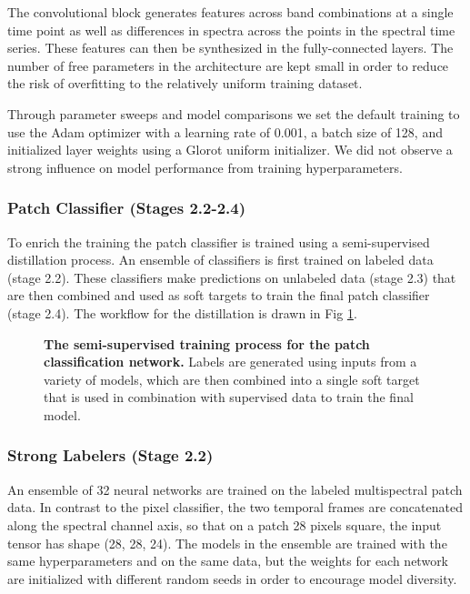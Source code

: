 \documentclass[10pt,letterpaper]{article}
\begin{document}
The convolutional block generates features across band combinations at a single time point as well as differences in spectra across the points in the spectral time series. These features can then be synthesized in the fully-connected layers. The number of free parameters in the architecture are kept small in order to reduce the risk of overfitting to the relatively uniform training dataset.

Through parameter sweeps and model comparisons we set the default training to use the Adam optimizer with a learning rate of 0.001, a batch size of 128, and initialized layer weights using a Glorot uniform initializer. We did not observe a strong influence on model performance from training hyperparameters.

\subsubsection*{Patch Classifier (Stages 2.2-2.4)}
To enrich the training the patch classifier is trained using a semi-supervised distillation process. An ensemble of classifiers is first trained on labeled data (stage 2.2). These classifiers make predictions on unlabeled data (stage 2.3) that are then combined and used as soft targets to train the final patch classifier (stage 2.4). The workflow for the distillation is drawn in Fig \ref{fig:patch_pipeline}.

\begin{figure}[!h]
    \caption{{\bf The semi-supervised training process for the patch classification network.}
    Labels are generated using inputs from a variety of models, which are then combined into a single soft target that is used in combination with supervised data to train the final model.}
    \label{fig:patch_pipeline}
\end{figure}

\subsubsection*{Strong Labelers (Stage 2.2)}
An ensemble of 32 neural networks are trained on the labeled multispectral patch data. In contrast to the pixel classifier, the two temporal frames are concatenated along the spectral channel axis, so that on a patch 28 pixels square, the input tensor has shape (28, 28, 24). The models in the ensemble are trained with the same hyperparameters and on the same data, but the weights for each network are initialized with different random seeds in order to encourage model diversity.
\end{document}
